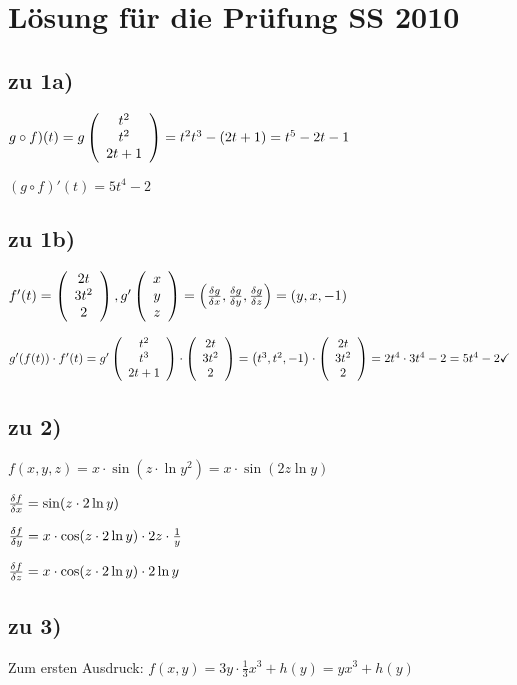\renewcommand{\ldate}{2016-01-07}


\section{Lösung für die Prüfung SS 2010}

\subsection{zu 1a)}
$ g\circ f) (t) = g  \left(  \begin{array}{c} t^2\\t^2\\2t+1 \end{array}  \right)   = t^2 t^3 - (2t+1) = t^5 - 2t - 1$

$ (g\circ f)' (t) = 5 t^4 - 2$

\subsection{zu 1b)}
$ f'(t) =   \left(  \begin{array}{c} 2t\\3 t^2\\2 \end{array}  \right)  , g'  \left(  \begin{array}{c} x\\y\\z \end{array}  \right)   =  \left( \frac{\delta g}{\delta x},\frac{\delta g}{\delta y},\frac{\delta g}{\delta z} \right)  =  \left( y,x,-1 \right)  $

$g'(f(t)) \cdot f'(t) = g'   \left(  \begin{array}{c} t^2\\t^3\\2t+1 \end{array}  \right)   \cdot   \left(  \begin{array}{c} 2t\\3t^2\\2 \end{array}  \right)   =  \left( t^3, t^2, -1 \right)  \cdot   \left(  \begin{array}{c} 2t\\3t^2\\2 \end{array}  \right)   = 2t^4 \cdot 3t^4 - 2 = 5t^4 - 2 \checkmark$

\subsection{zu 2)}
$ f(x,y,z) = x\cdot \sin (z\cdot \ln y^2) = x \cdot \sin (2z \ln y)$

$ \frac{\delta f}{\delta x} = \sin(z\cdot 2 \ln y)$

$\frac{\delta f}{\delta y} = x\cdot \cos (z\cdot 2 \ln y) \cdot 2z \cdot \frac{1}{y} $

$\frac{\delta f}{\delta z} = x\cdot \cos (z\cdot 2 \ln y) \cdot 2 \ln y$

\subsection{zu 3)}
Zum ersten Ausdruck: 
$ f(x,y) = 3y \cdot \frac{1}{3} x^3 + h(y) = yx^3 + h(y) $


